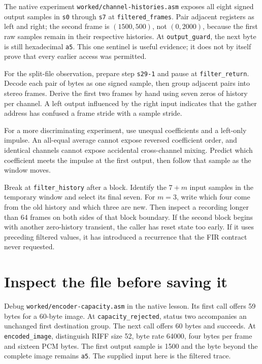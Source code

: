 The native experiment \texttt{worked/channel-histories.asm} exposes all eight
signed output samples in \texttt{s0} through \texttt{s7} at
\texttt{filtered\_frames}. Pair adjacent registers as left and right; the
second frame is $(1500,500)$, not $(0,2000)$, because the first raw samples
remain in their respective histories. At \texttt{output\_guard}, the next
byte is still hexadecimal \texttt{a5}. This one sentinel is useful evidence;
it does not by itself prove that every earlier access was permitted.

For the split-file observation, prepare step \texttt{s29-1} and pause at
\texttt{filter\_return}. Decode each
pair of bytes as one signed sample, then group adjacent pairs into stereo
frames. Derive the first two frames by hand using seven zeros of history per
channel. A left output influenced by the right input indicates that the gather
address has confused a frame stride with a sample stride.

For a more discriminating experiment, use unequal coefficients and a left-only
impulse. An all-equal average cannot expose reversed coefficient order, and
identical channels cannot expose accidental cross-channel mixing. Predict
which coefficient meets the impulse at the first output, then follow that
sample as the window moves.

Break at \texttt{filter\_history} after a block. Identify the $7+m$ input
samples in the temporary window and select its final seven. For $m=3$, write
which four come from the old history and which three are new. Then inspect a
recording longer than 64 frames on both sides of that block boundary. If the
second block begins with another zero-history transient, the caller has reset
state too early. If it uses preceding filtered values, it has introduced a
recurrence that the FIR contract never requested.

\section{Inspect the file before saving it}

Debug \texttt{worked/encoder-capacity.asm} in the native lesson. Its first
call offers 59 bytes for a 60-byte image. At \texttt{capacity\_rejected},
status two accompanies an unchanged first destination group. The next call
offers 60 bytes and succeeds. At \texttt{encoded\_image}, distinguish
RIFF size 52, byte rate 64000, four bytes per frame and sixteen PCM bytes.
The first output sample is 1500 and the byte beyond the complete image remains
\texttt{a5}. The supplied input here is the filtered trace.

